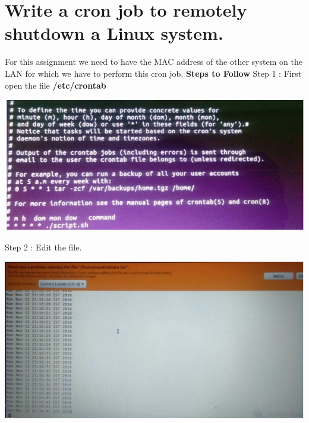 \documentclass{article}
\begin{document}
\section{Write a cron job to remotely shutdown a Linux system.}
For this assignment we need to have the MAC address of the other system on the LAN for which we have to perform this cron job.
\newline
\newline
\textbf{Steps to Follow}
\newline
Step 1 : First open the file \textbf{/etc/crontab}\newline
\begin{center}
    \includegraphics[scale=1]{cron1.PNG}
\end{center}
Step 2 : Edit the file.\newline
\begin{center}
    \includegraphics[scale=1]{cron3.PNG}
\end{center}
\newpage
\end{document}

